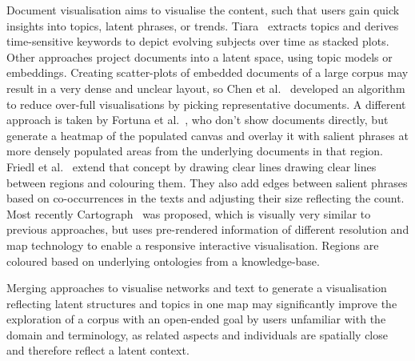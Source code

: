 Document visualisation aims to visualise the content, such that users gain quick insights into topics, latent phrases, or trends.
Tiara~\cite{wei2010tiara} extracts topics and derives time-sensitive keywords to depict evolving subjects over time as stacked plots.
Other approaches project documents into a latent space, using topic models or embeddings.
Creating scatter-plots of embedded documents of a large corpus may result in a very dense and unclear layout, so Chen et al.~\cite{chen2009exemplar} developed an algorithm to reduce over-full visualisations by picking representative documents.
A different approach is taken by Fortuna et al.~\cite{fortuna2005visualization}, who don't show documents directly, but generate a heatmap of the populated canvas and overlay it with salient phrases at more densely populated areas from the underlying documents in that region.
Friedl et al.~\cite{fried2014maps} extend that concept by drawing clear lines drawing clear lines between regions and colouring them.
They also add edges between salient phrases based on co-occurrences in the texts and adjusting their size reflecting the count.
Most recently Cartograph~\cite{sen2017cartograph} was proposed, which is visually very similar to previous approaches, but uses pre-rendered information of different resolution and map technology to enable a responsive interactive visualisation.
Regions are coloured based on underlying ontologies from a knowledge-base.

Merging approaches to visualise networks and text to generate a visualisation reflecting latent structures and topics in one map may significantly improve the exploration of a corpus with an open-ended goal by users unfamiliar with the domain and terminology, as related aspects and individuals are spatially close and therefore reflect a latent context.


% 


